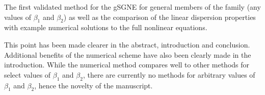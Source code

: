 \documentclass[10pt]{article}
\begin{document}
The first validated method for the gSGNE for general members of the family (any values of $\beta_1$ and $\beta_2$) as well as the comparison of the linear dispersion properties with example numerical solutions to the full nonlinear equations.


This point has been made clearer in the abstract, introduction and conclusion. Additional benefits of the numerical scheme have also been clearly made in the introduction. While the numerical method compares well to other methods for select values of $\beta_1$ and $\beta_2$, there are currently no methods for arbitrary values of $\beta_1$ and $\beta_2$, hence the novelty of the manuscript.
\end{document}
